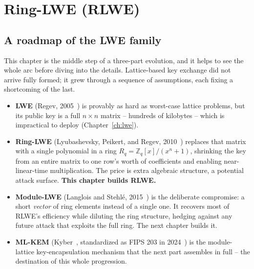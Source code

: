\chapter{Ring-LWE (RLWE)}
\label{ch:rlwe}

\section{A roadmap of the LWE family}

This chapter is the middle step of a three-part evolution, and it helps to see the whole arc before diving into the details. Lattice-based key exchange did not arrive fully formed; it grew through a sequence of assumptions, each fixing a shortcoming of the last.

\begin{center}
\end{center}

\begin{itemize}
  \item \textbf{LWE} (Regev, 2005~\cite{regev2009}) is provably as hard as worst-case lattice problems, but its public key is a full $n\times n$ matrix -- hundreds of kilobytes -- which is impractical to deploy (Chapter~\ref{ch:lwe}).
  \item \textbf{Ring-LWE} (Lyubashevsky, Peikert, and Regev, 2010~\cite{lpr2010}) replaces that matrix with a single polynomial in a ring $R_q=\mathbb{Z}_q[x]/(x^n+1)$, shrinking the key from an entire matrix to one row's worth of coefficients and enabling near-linear-time multiplication. The price is extra algebraic structure, a potential attack surface. \textbf{This chapter builds RLWE.}
  \item \textbf{Module-LWE} (Langlois and Stehl\'e, 2015~\cite{langlois2015}) is the deliberate compromise: a short \emph{vector} of ring elements instead of a single one. It recovers most of RLWE's efficiency while diluting the ring structure, hedging against any future attack that exploits the full ring. The next chapter builds it.
  \item \textbf{ML-KEM} (Kyber~\cite{kyber2018}, standardized as FIPS 203 in 2024~\cite{fips203}) is the module-lattice key-encapsulation mechanism that the next part assembles in full -- the destination of this whole progression.
\end{itemize}

